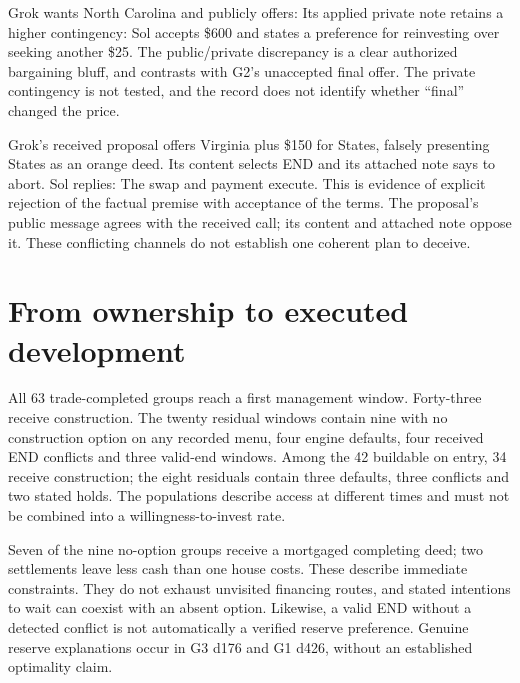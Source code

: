 
Grok wants North Carolina and publicly offers:
Its applied private note retains a higher contingency:
Sol accepts \$600 and states a preference for reinvesting over seeking another \$25. The public/private discrepancy is a clear authorized bargaining bluff, and contrasts with G2's unaccepted final offer. The private contingency is not tested, and the record does not identify whether ``final'' changed the price.


Grok's received proposal offers Virginia plus \$150 for States, falsely presenting States as an orange deed. Its content selects END and its attached note says to abort. Sol replies:
The swap and payment execute. This is evidence of explicit rejection of the factual premise with acceptance of the terms. The proposal's public message agrees with the received call; its content and attached note oppose it. These conflicting channels do not establish one coherent plan to deceive.

\section{From ownership to executed development}

All 63 trade-completed groups reach a first management window. Forty-three receive construction. The twenty residual windows contain nine with no construction option on any recorded menu, four engine defaults, four received END conflicts and three valid-end windows. Among the 42 buildable on entry, 34 receive construction; the eight residuals contain three defaults, three conflicts and two stated holds. The populations describe access at different times and must not be combined into a willingness-to-invest rate.

Seven of the nine no-option groups receive a mortgaged completing deed; two settlements leave less cash than one house costs. These describe immediate constraints. They do not exhaust unvisited financing routes, and stated intentions to wait can coexist with an absent option. Likewise, a valid END without a detected conflict is not automatically a verified reserve preference. Genuine reserve explanations occur in G3 d176 and G1 d426, without an established optimality claim.

